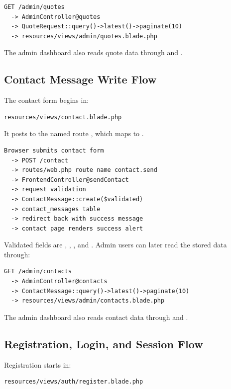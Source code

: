 \documentclass[11pt,a4paper]{article}
\begin{document}
\begin{verbatim}
GET /admin/quotes
  -> AdminController@quotes
  -> QuoteRequest::query()->latest()->paginate(10)
  -> resources/views/admin/quotes.blade.php
\end{verbatim}

The admin dashboard also reads quote data through  and .

\subsection{Contact Message Write Flow}

The contact form begins in:

\begin{verbatim}
resources/views/contact.blade.php
\end{verbatim}

It posts to the named route , which maps to .

\begin{verbatim}
Browser submits contact form
  -> POST /contact
  -> routes/web.php route name contact.send
  -> FrontendController@sendContact
  -> request validation
  -> ContactMessage::create($validated)
  -> contact_messages table
  -> redirect back with success message
  -> contact page renders success alert
\end{verbatim}

Validated fields are , , , and . Admin users can later read the stored data through:

\begin{verbatim}
GET /admin/contacts
  -> AdminController@contacts
  -> ContactMessage::query()->latest()->paginate(10)
  -> resources/views/admin/contacts.blade.php
\end{verbatim}

The admin dashboard also reads contact data through  and .

\subsection{Registration, Login, and Session Flow}

Registration starts in:

\begin{verbatim}
resources/views/auth/register.blade.php
\end{verbatim}
\end{document}
